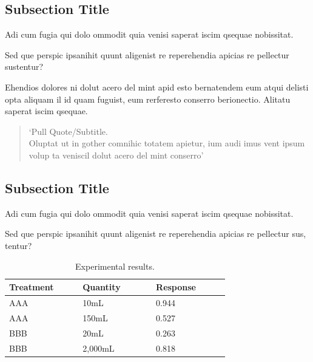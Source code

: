 \documentclass[
	landscape,       %
]{ImperialPoster}
\begin{document}
\medskip %

\begin{multicols}{4} %

	\subsection{Subsection Title}

	Adi cum fugia qui dolo ommodit quia venisi saperat iscim qsequae nobissitat.

	Sed que perspic ipsanihit quunt aligenist re reperehendia \textcolor{ICLGreen}{apicias re pellectur sustentur?}

	Ehendios \textcolor{ICLGreen}{dolores} ni dolut acero del mint apid esto bernatendem eum \textcolor{ICLGreen}{atqui delisti opta} aliquam il id quam fuguist, eum rerferesto conserro berionectio. Alitatu saperat iscim qsequae.

	\begin{quote}
		`Pull Quote/Subtitle.\\
		Oluptat ut in gother comnihic totatem apietur, ium audi imus vent ipsum volup ta veniscil dolut acero del mint conserro'
	\end{quote}

	\subsection{Subsection Title}

	Adi cum fugia qui dolo ommodit quia venisi saperat iscim qsequae nobissitat.

	Sed que perspic ipsanihit quunt aligenist re reperehendia apicias re pellectur sus, tentur?

	\begin{table}[H] %
		\caption{Experimental results.}
		\begin{tabular}{L{0.24\linewidth} C{0.24\linewidth} R{0.24\linewidth}}
			\toprule
			Treatment & Quantity & Response\\
			\midrule
			AAA & 10mL & 0.944\\
			AAA & 150mL & 0.527\\
			BBB & 20mL & 0.263\\
			BBB & 2,000mL & 0.818\\
			\bottomrule
		\end{tabular}
	\end{table}


\end{multicols}
\end{document}
